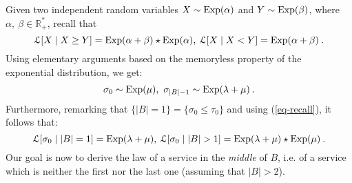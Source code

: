 \documentclass[11pt,a4paper]{article}
\numberwithin{equation}{section}
\newcommand{\mrm}[1]{\text{\rm #1}}
\newcommand{\R}{\mathbb{R}}
\newcommand{\1}{\mathbbm{1}}
\newcommand{\Lom}{\mathcal{L}}
\def\eref#1{(\ref{#1})}
\begin{document}
Given two independent random variables $X \sim \mrm{Exp}(\alpha)$
and $Y \sim \mrm{Exp}(\beta)$, where $\alpha,\:\beta \in \R^*_+$,
recall that
\begin{equation}\label{eq-recall}
\Lom[X\mid X\geq Y] = \mrm{Exp}(\alpha +\beta) \star  \mrm{Exp}(\alpha) , \:
\Lom[X\mid X < Y] = \mrm{Exp}(\alpha +\beta)\:.
\end{equation}
Using elementary arguments based on the memoryless property of the
exponential distribution, we get:
\begin{equation}\label{eq-basic}
\sigma_0 \sim \mrm{Exp}(\mu), \ \sigma_{|B|-1} \sim \mrm{Exp}(\lambda+\mu)
\:.
\end{equation}
Furthermore, remarking that $\{|B|=1\}=\{\sigma_0 \leq \tau_0\}$ and
using \eref{eq-recall}, it follows that:
\begin{equation}\label{eq-basic2}
\Lom[\sigma_0 \mid |B|=1] = \mrm{Exp}(\lambda+\mu),\:
\Lom[\sigma_0 \mid |B|>1 ] = \mrm{Exp}(\lambda+\mu)
\star \mrm{Exp}(\mu)\:.
\end{equation}
Our goal is now to derive the law of a service in the {\em middle} of
$B$, i.e. of a service which is neither the first nor the last one
(assuming that $|B|>2$).
\end{document}
